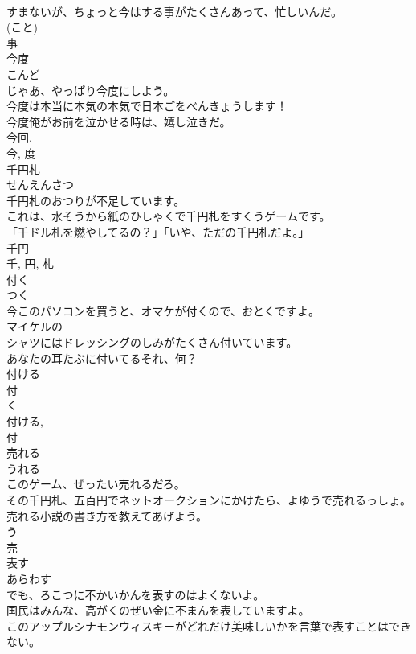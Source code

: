 \documentclass[8pt]{extreport}
\begin{document}
\begin{CJK}{UTF8}{min}
\\	すまないが、ちょっと今はする事がたくさんあって、忙しいんだ。	
\\	(こと) 
\\	事	
\\	今度	
\\	こんど	
\\	じゃあ、やっぱり今度にしよう。	
\\	今度は本当に本気の本気で日本ごをべんきょうします！	
\\	今度俺がお前を泣かせる時は、嬉し泣きだ。	
\\	今回.
\\	今, 度	
\\	千円札	
\\	せんえんさつ	
\\	千円札のおつりが不足しています。	
\\	これは、水そうから紙のひしゃくで千円札をすくうゲームです。	
\\	「千ドル札を燃やしてるの？」「いや、ただの千円札だよ。」	
\\	千円 
\\	千, 円, 札	
\\	付く	
\\	つく	
\\	今このパソコンを買うと、オマケが付くので、おとくですよ。	
\\	マイケルの
\\	シャツにはドレッシングのしみがたくさん付いています。	
\\	あなたの耳たぶに付いてるそれ、何？	
\\	付ける 
\\	付 
\\	く 
\\	付ける, 
\\	付	
\\	売れる	
\\	うれる	
\\	このゲーム、ぜったい売れるだろ。	
\\	その千円札、五百円でネットオークションにかけたら、よゆうで売れるっしょ。	
\\	売れる小説の書き方を教えてあげよう。	
\\	う 
\\	売	
\\	表す	
\\	あらわす	
\\	でも、ろこつに不かいかんを表すのはよくないよ。	
\\	国民はみんな、高がくのぜい金に不まんを表していますよ。	
\\	このアップルシナモンウィスキーがどれだけ美味しいかを言葉で表すことはできない。	

\end{CJK}
\end{document}
